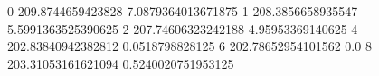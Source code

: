 0 209.8744659423828 7.0879364013671875
1 208.3856658935547 5.5991363525390625
2 207.74606323242188 4.95953369140625
4 202.83840942382812 0.0518798828125
6 202.78652954101562 0.0
8 203.31053161621094 0.5240020751953125
